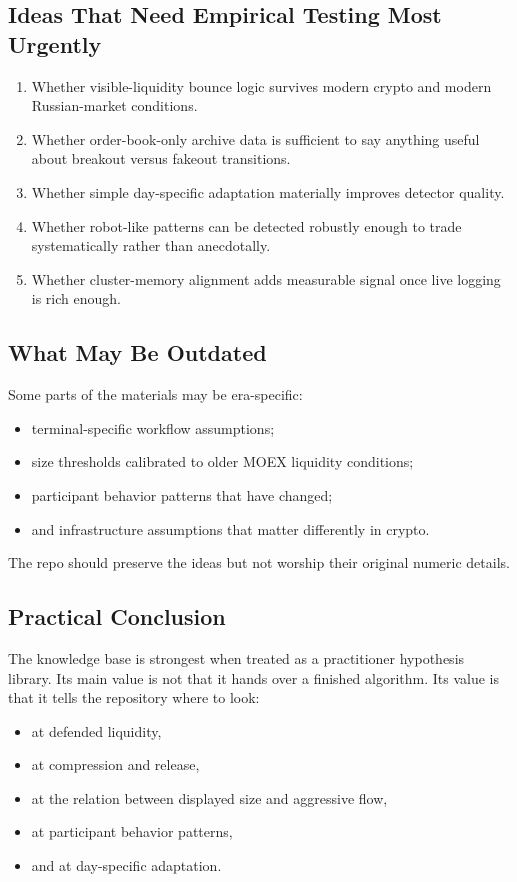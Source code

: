 \subsection{Ideas That Need Empirical Testing Most Urgently}

\begin{enumerate}
  \item Whether visible-liquidity bounce logic survives modern crypto and modern Russian-market conditions.
  \item Whether order-book-only archive data is sufficient to say anything useful about breakout versus fakeout transitions.
  \item Whether simple day-specific adaptation materially improves detector quality.
  \item Whether robot-like patterns can be detected robustly enough to trade systematically rather than anecdotally.
  \item Whether cluster-memory alignment adds measurable signal once live logging is rich enough.
\end{enumerate}

\subsection{What May Be Outdated}

Some parts of the materials may be era-specific:
\begin{itemize}
  \item terminal-specific workflow assumptions;
  \item size thresholds calibrated to older MOEX liquidity conditions;
  \item participant behavior patterns that have changed;
  \item and infrastructure assumptions that matter differently in crypto.
\end{itemize}

The repo should preserve the ideas but not worship their original numeric details.

\subsection{Practical Conclusion}

The knowledge base is strongest when treated as a practitioner hypothesis library.
Its main value is not that it hands over a finished algorithm.
Its value is that it tells the repository where to look:
\begin{itemize}
  \item at defended liquidity,
  \item at compression and release,
  \item at the relation between displayed size and aggressive flow,
  \item at participant behavior patterns,
  \item and at day-specific adaptation.
\end{itemize}

